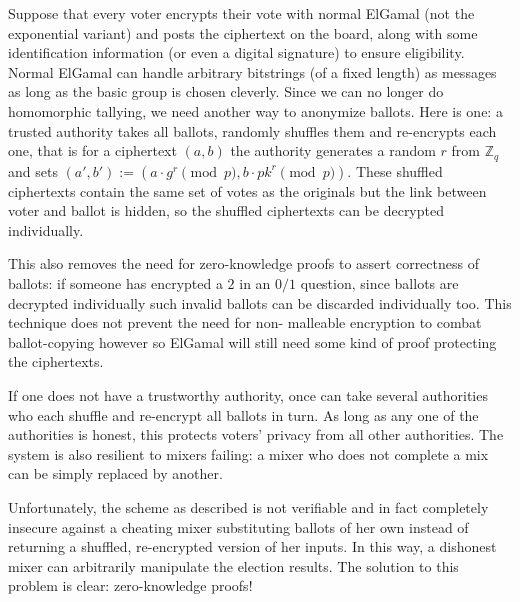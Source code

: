 \documentclass[envcountsame]{llncs}
\begin{document}
Suppose that every voter encrypts their vote with normal ElGamal (not the
exponential variant) and posts the ciphertext on the board, along with some
identification information (or even a digital signature) to ensure eligibility.
Normal ElGamal can handle arbitrary bitstrings (of a fixed length) as messages
as long as the basic group is chosen cleverly\footnotemark.
Since we can no longer do homomorphic tallying, we need another way to anonymize
ballots. Here is one: a trusted authority takes all ballots, randomly shuffles
them and re-encrypts each one, that is for a ciphertext $(a, b)$ the authority
generates a random $r$ from $\mathbb Z_q$ and sets
$(a', b') := (a \cdot g^r \pmod{p}, b \cdot pk^r \pmod{p})$.
These shuffled ciphertexts contain the same set of votes as the originals but
the link between voter and ballot is hidden, so the shuffled ciphertexts can be
decrypted individually.

This also removes the need for zero-knowledge proofs to assert correctness of
ballots: if someone has encrypted a $2$ in an $0/1$ question, since ballots are
decrypted individually such invalid ballots can be discarded individually too.
This technique does not prevent the need for non- malleable encryption to combat
ballot-copying however so ElGamal will still need some kind of proof protecting
the ciphertexts.

If one does not have a trustworthy authority, once can take several authorities
who each shuffle and re-encrypt all ballots in turn. As long as any one of the
authorities is honest, this protects voters' privacy from all other authorities.
The system is also resilient to mixers failing: a mixer who does not complete a
mix can be simply replaced by another.

Unfortunately, the scheme as described is not verifiable and in fact completely
insecure against a cheating mixer substituting ballots of her own instead of
returning a shuffled, re-encrypted version of her inputs. In this way, a
dishonest mixer can arbitrarily manipulate the election results. The solution to
this problem is clear: zero-knowledge proofs!
\end{document}
